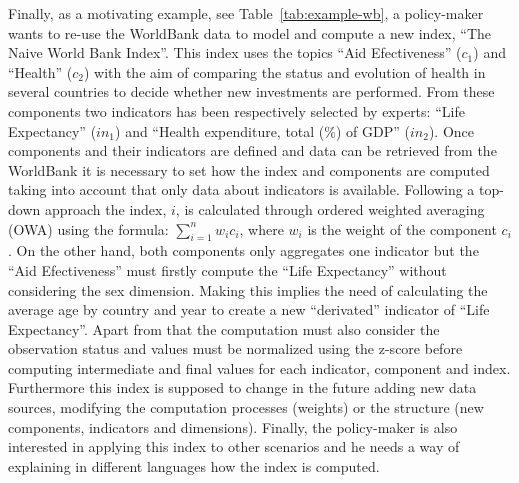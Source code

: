 \documentclass{llncs}
\begin{document}
Finally, as a motivating example, see Table~\ref{tab:example-wb}, a policy-maker wants to re-use the WorldBank data to model and compute a new index, ``The Naive World Bank Index''. This 
index uses the topics ``Aid Efectiveness'' ($c_1$) and ``Health'' ($c_2$) with the aim of comparing the status and evolution of health in several countries to decide whether new 
investments are performed. From these components two indicators has been respectively selected by experts: ``Life Expectancy'' ($in_1$) and ``Health expenditure, total (\%) of GDP'' ($in_2$). 
Once components and their indicators are defined and data can be retrieved from the WorldBank it is necessary to set how the index and components are computed 
taking into account that only data about indicators is available. Following a top-down approach the index, $i$, is calculated through ordered weighted averaging (OWA) using the 
formula: $\sum_{i=1}^n  w_i c_i$, where $w_i$ is the weight of the component $c_i$. On the other hand, both components only aggregates one indicator but the ``Aid Efectiveness'' 
must firstly compute the ``Life Expectancy'' without considering the sex dimension. Making this implies the need of calculating the average age by country and year to create 
a new ``derivated'' indicator of ``Life Expectancy''. Apart from that the computation must also consider the observation status and values must be normalized using the 
z-score before computing intermediate and final values for each indicator, component and index. Furthermore this index is supposed to change in the future 
adding new data sources, modifying the computation processes (weights) or the structure (new components, indicators and dimensions). Finally, the policy-maker 
is also interested in applying this index to other scenarios and he needs a way of explaining in different languages how the index is computed. 
\end{document}
